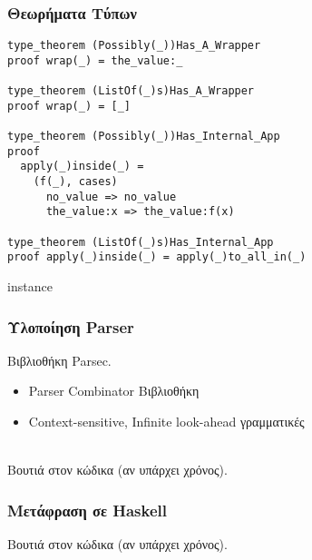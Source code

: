 \documentclass{beamer}
\def\e{\foreignlanguage{english}}
\def\h{\e{Haskell}}
\begin{document}
\begin{frame}[fragile]

\frametitle{Θεωρήματα Τύπων}

\begin{otherlanguage}{english}
\begin{verbatim}
type_theorem (Possibly(_))Has_A_Wrapper
proof wrap(_) = the_value:_

type_theorem (ListOf(_)s)Has_A_Wrapper
proof wrap(_) = [_]

type_theorem (Possibly(_))Has_Internal_App
proof
  apply(_)inside(_) =
    (f(_), cases)
      no_value => no_value
      the_value:x => the_value:f(x)

type_theorem (ListOf(_)s)Has_Internal_App
proof apply(_)inside(_) = apply(_)to_all_in(_)
\end{verbatim}
\end{otherlanguage}

\e{instance}

\end{frame}

\begin{frame}

\frametitle{Υλοποίηση \e{Parser}}

Βιβλιοθήκη \e{Parsec}.

\begin{itemize}
\item \e{Parser Combinator} Βιβλιοθήκη
\item \e{Context-sensitive, Infinite look-ahead} γραμματικές
\\~\
\end{itemize}

Βουτιά στον κώδικα (αν υπάρχει χρόνος).
\end{frame}

\begin{frame}

\frametitle{Μετάφραση σε \h}

Βουτιά στον κώδικα (αν υπάρχει χρόνος).

\end{frame}
\end{document}
